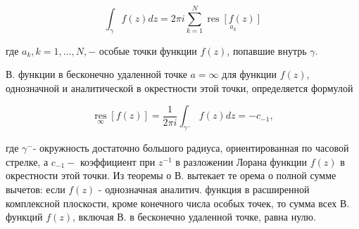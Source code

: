 \documentclass[10pt]{article}
\begin{document}
\[

\int_{\gamma} f(z) d z=2 \pi i \sum_{k=1}^{N} \underset{a_{k}}{\operatorname{res}[f(z)]}

\]



где $a_{k}, k=1, \ldots, N,-$ особые точки функции $f(z)$, попавшие внутрь $\gamma$.



В. функции в бесконечно удаленной точке $a=\infty$ для функции $f(z)$, однозначной и аналитической в окрестности этой точки, определяется формулой



\[

\underset{\infty}{\operatorname{res}}[f(z)]=\frac{1}{2 \pi i} \int_{\gamma^{-}} f(z) d z=-c_{-1},

\]



где $\gamma^{-}$- окружность достаточно большого радиуса, ориентированная по часовой стрелке, а $c_{-1}-$ коэффициент при $z^{-1}$ в разложении Лорана функции $f(z)$ в окрестности этой точки. Из теоремы о В. вытекает те орема о полной сумме вычетов: если $f(z)$ - однозначная аналитич. функция в расширенной комплексной плоскости, кроме конечного числа особых точек, то сумма всех В. функций $f(z)$, включая В. в бесконечно удаленной точке, равна нулю.
\end{document}
